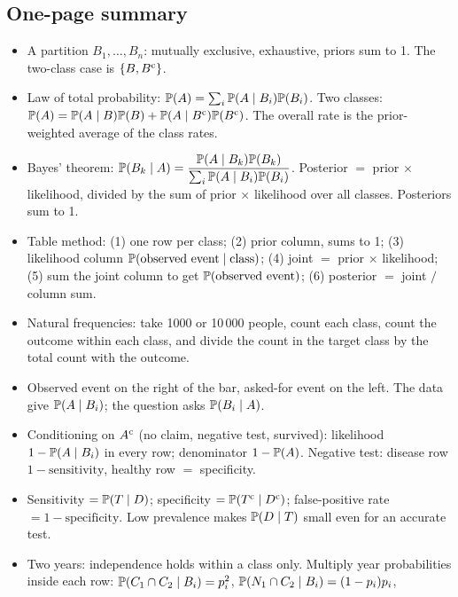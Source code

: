 \subsection{One-page summary}

\begin{itemize}[nosep,leftmargin=2em]
  \item A partition $B_1, \dots, B_n$: mutually exclusive, exhaustive, priors sum to 1.
        The two-class case is $\{B, B^{\mathrm{c}}\}$.
  \item Law of total probability: $\mathbb{P}(A) = \sum_i \mathbb{P}(A \mid B_i)\mathbb{P}(B_i)$.
        Two classes: $\mathbb{P}(A) = \mathbb{P}(A \mid B)\mathbb{P}(B) + \mathbb{P}(A \mid B^{\mathrm{c}})\mathbb{P}(B^{\mathrm{c}})$.
        The overall rate is the prior-weighted average of the class rates.
  \item Bayes' theorem: $\mathbb{P}(B_k \mid A) = \dfrac{\mathbb{P}(A \mid B_k)\mathbb{P}(B_k)}{\sum_i \mathbb{P}(A \mid B_i)\mathbb{P}(B_i)}$.
        Posterior $=$ prior $\times$ likelihood, divided by the sum of prior $\times$ likelihood
        over all classes. Posteriors sum to 1.
  \item Table method: (1) one row per class; (2) prior column, sums to 1; (3) likelihood
        column $\mathbb{P}(\text{observed event} \mid \text{class})$; (4) joint $=$ prior $\times$
        likelihood; (5) sum the joint column to get $\mathbb{P}(\text{observed event})$;
        (6) posterior $=$ joint $/$ column sum.
  \item Natural frequencies: take 1000 or 10\,000 people, count each class, count the
        outcome within each class, and divide the count in the target class by the total
        count with the outcome.
  \item Observed event on the right of the bar, asked-for event on the left. The data give
        $\mathbb{P}(A \mid B_i)$; the question asks $\mathbb{P}(B_i \mid A)$.
  \item Conditioning on $A^{\mathrm{c}}$ (no claim, negative test, survived): likelihood
        $1 - \mathbb{P}(A \mid B_i)$ in every row; denominator $1 - \mathbb{P}(A)$.
        Negative test: disease row $1 - \text{sensitivity}$, healthy row $=$ specificity.
  \item Sensitivity $= \mathbb{P}(T \mid D)$; specificity $= \mathbb{P}(T^{\mathrm{c}} \mid D^{\mathrm{c}})$;
        false-positive rate $= 1 - \text{specificity}$. Low prevalence makes $\mathbb{P}(D \mid T)$
        small even for an accurate test.
  \item Two years: independence holds within a class only. Multiply year probabilities inside
        each row: $\mathbb{P}(C_1 \cap C_2 \mid B_i) = p_i^2$, $\mathbb{P}(N_1 \cap C_2 \mid B_i) = (1 - p_i)p_i$,

\end{itemize}
